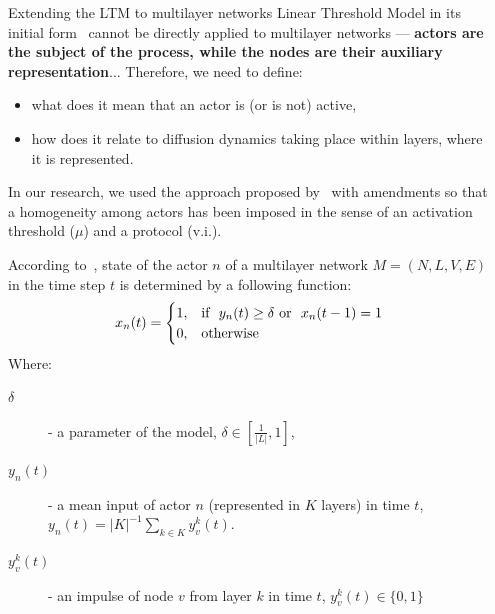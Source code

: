 \documentclass[final]{beamer}
\newlength{\sepwidth}
\newlength{\colwidth}
\newcommand{\separatorcolumn}{\begin{column}{\sepwidth}\end{column}}
\begin{document}
\begin{frame}[t, fragile]
\begin{columns}[t]
\separatorcolumn
\begin{column}{\colwidth}

\begin{alertblock}{Extending the LTM to multilayer networks}
    Linear Threshold Model in its initial form~\cite{kempe2003maximizing} cannot be directly applied to multilayer networks --- \textbf{actors are the subject of the process, while the nodes are their auxiliary representation}...
    Therefore, we need to define:
    \begin{itemize}
        \item what does it mean that an actor is (or is not) active,
        \item how does it relate to diffusion dynamics taking place within 
        layers, where it is represented.
    \end{itemize}
    In our research, we used the approach proposed by~\cite{zhong2022mltm} with amendments so that a homogeneity among actors has been imposed in the sense of an activation threshold ($\mu$) and a protocol (v.i.).

    \label{def:proto}
        According to~\cite{zhong2022mltm}, state of the actor $n$ of a multilayer network $M = (N, L, V, E)$ in the time step $t$ is determined
        by a following function: 
        \begin{equation*}
            x_{n}(t) =
            \begin{cases}
              1,  & \text{if \space} y_{n}(t) \geq \delta \text{\space or 
                \space} x_{n}(t-1) = 1 \\
              0,  & \text{otherwise}
            \end{cases} 
        \end{equation*}
        Where:
        \begin{description}
            \item[$\delta$] - a parameter of the model, $\delta \in [\frac{1}{|L|}, 1]$,
            \item[$y_{n}(t)$] - a mean input of actor $n$ (represented in $K$ layers) in time $t$, $y_{n}(t) = |K|^{-1} \sum_{k \in K} y_{v}^{k}(t)$.
            \item[$y_{v}^{k}(t)$] - an impulse of node $v$ from layer $k$ in time $t$, $y_{v}^{k}(t) \in \{0, 1\}$
        \end{description}


\end{alertblock}
\end{column}
\end{columns}
\end{frame}
\end{document}
